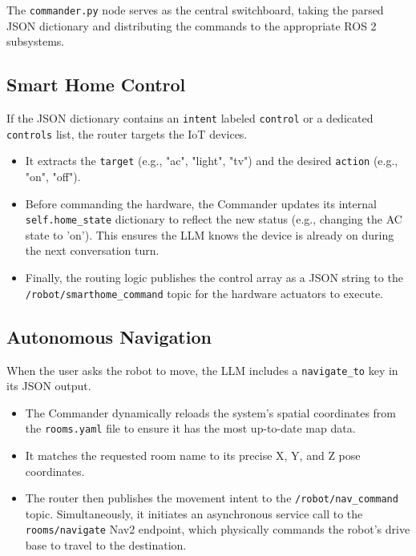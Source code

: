 The \texttt{commander.py} node serves as the central switchboard, taking the parsed JSON dictionary and distributing the commands to the appropriate ROS 2 subsystems.

\subsection{Smart Home Control}
If the JSON dictionary contains an \texttt{intent} labeled \texttt{control} or a dedicated \texttt{controls} list, the router targets the IoT devices.
\begin{itemize}
    \item It extracts the \texttt{target} (e.g., "ac", "light", "tv") and the desired \texttt{action} (e.g., "on", "off").
    \item Before commanding the hardware, the Commander updates its internal \texttt{self.home\_state} dictionary to reflect the new status (e.g., changing the AC state to 'on'). This ensures the LLM knows the device is already on during the next conversation turn.
    \item Finally, the routing logic publishes the control array as a JSON string to the \texttt{/robot/smarthome\_command} topic for the hardware actuators to execute.
\end{itemize}

\subsection{Autonomous Navigation}
When the user asks the robot to move, the LLM includes a \texttt{navigate\_to} key in its JSON output.
\begin{itemize}
    \item The Commander dynamically reloads the system's spatial coordinates from the \texttt{rooms.yaml} file to ensure it has the most up-to-date map data.
    \item It matches the requested room name to its precise X, Y, and Z pose coordinates.
    \item The router then publishes the movement intent to the \texttt{/robot/nav\_command} topic. Simultaneously, it initiates an asynchronous service call to the \texttt{rooms/navigate} Nav2 endpoint, which physically commands the robot's drive base to travel to the destination.
\end{itemize}

